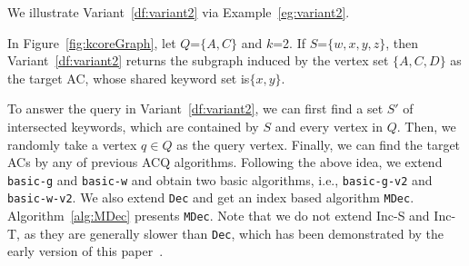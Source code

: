 {We illustrate Variant~\ref{df:variant2} via Example~\ref{eg:variant2}.

\begin{example}
\label{eg:variant2}
In Figure~\ref{fig:kcoreGraph}, let $Q$=$\{A,C\}$ and $k$=2.
If $S$=$\{w,x,y,z\}$, then Variant~\ref{df:variant2} returns the subgraph induced by the vertex set $\{A,C,D\}$ as the target AC, whose shared keyword set is$\{x,y\}$.
\end{example}

To answer the query in Variant~\ref{df:variant2}, we can first find a set $S'$ of intersected keywords, which are contained by $S$ and every vertex in $Q$. Then, we randomly take a vertex $q$$\in$$Q$ as the query vertex.
Finally, we can find the target ACs by any of previous ACQ algorithms.
Following the above idea, we extend {\tt basic-g} and {\tt basic-w} and obtain two basic algorithms, i.e., {\tt basic-g-v2} and {\tt basic-w-v2}. We also extend {\tt Dec} and get an index based algorithm {\tt MDec}.
Algorithm~\ref{alg:MDec} presents {\tt MDec}.
Note that we do not extend {Inc-S} and {Inc-T}, as they are generally slower than {\tt Dec}, which has been demonstrated by the early version of this paper~\cite{fangeffective}.


} 